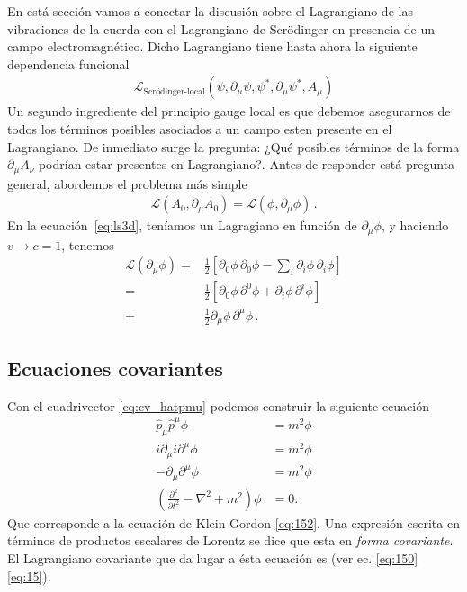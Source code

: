 En está sección vamos a conectar la discusión sobre el Lagrangiano de las vibraciones de la cuerda con el Lagrangiano de Scr\"odinger en presencia de un campo electromagnético. Dicho Lagrangiano tiene hasta ahora la siguiente dependencia funcional
\begin{align*}
  \mathcal{L}_{\text{Scrödinger-local}}(\psi,\partial_{\mu}\psi,\psi^{*},\partial_{\mu}\psi^{*},A_{\mu})
\end{align*}
Un segundo ingrediente del principio gauge local es que debemos asegurarnos de todos los términos posibles asociados a un campo esten presente en el Lagrangiano. De inmediato surge la pregunta: ¿Qué posibles términos de la forma $\partial_{\mu}A_{\nu}$ podrían estar presentes en Lagrangiano?. Antes de responder está pregunta general, abordemos el problema más simple
\begin{align*}
  \mathcal{L}(A_0,\partial_\mu A_0)=  \mathcal{L}(\phi,\partial_\mu \phi)\,.
\end{align*}
En la ecuación~\eqref{eq:ls3d}, teníamos un Lagragiano en función de $\partial_{\mu}\phi$, y haciendo $v\to c=1$, tenemos
\begin{align*}
  \mathcal{L}(\partial_{\mu}\phi)
    =&\frac{1}{2}\left[
      {\partial_0\phi}\,{\partial_0\phi}-\sum_i{\partial_i\phi}\,{\partial_i\phi}
   \right]\nonumber\\
    =&\frac{1}{2}\left[
      {\partial_0\phi}\,{\partial^0\phi}+{\partial_i\phi}\,{\partial^i\phi}
   \right]\nonumber\\
   =&\frac{1}{2}{\partial_\mu\phi}\,{\partial^\mu\phi}\,.
\end{align*}



\subsection{Ecuaciones covariantes}
\label{sec:ecuac-covar}


Con el cuadrivector \eqref{eq:cv_hatpmu} podemos construir la
siguiente ecuaci\'on
\begin{align}
  \hat{p}_\mu\hat{p}^\mu\phi&=m^2\phi\nonumber\\
  i\partial_\mu i\partial^\mu\phi&=m^2\phi\nonumber\\
  -\partial_\mu\partial^\mu\phi&=m^2\phi\nonumber\\
  \label{eq:waveec}
  \left(\frac{\partial^2}{\partial t^2}-\nabla^2+m^2\right)\phi&=0.
\end{align}
Que corresponde a la ecuaci\'on de Klein-Gordon \eqref{eq:152}. Una expresi\'on escrita en t\'erminos de productos escalares de Lorentz se dice que esta en \emph{forma covariante}. El Lagrangiano covariante que da lugar a
\'esta ecuaci\'on es (ver ec. \eqref{eq:150}
\eqref{eq:15}). %

